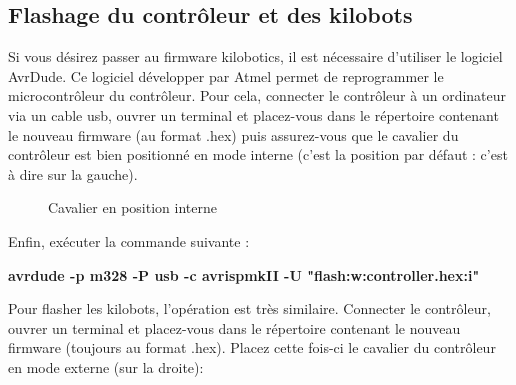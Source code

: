 \documentclass[a4paper,8pt]{report}
\begin{document}
\subsection*{Flashage du contr\^oleur et des kilobots}\label{sec:name}

Si vous d\'esirez passer au firmware kilobotics, il est n\'ecessaire d'utiliser le logiciel AvrDude. Ce logiciel d\'evelopper par Atmel permet de reprogrammer le microcontr\^oleur du contr\^oleur. Pour cela, connecter le contr\^oleur \`a un ordinateur via un cable usb, ouvrer un terminal et placez-vous dans le r\'epertoire contenant le nouveau firmware (au format .hex) puis assurez-vous que le cavalier du contr\^oleur est bien positionn\'e en mode interne (c'est la position par d\'efaut : c'est \`a dire sur la gauche). \\

\begin{figure}[!h]
    \centering
    \caption{Cavalier en position interne}
\end{figure}

Enfin, ex\'ecuter la commande suivante :\\

\begin{center}
  \textbf{avrdude -p m328  -P usb -c avrispmkII -U "flash:w:controller.hex:i"}
\end{center}

Pour flasher les kilobots, l'op\'eration est tr\`es similaire. Connecter le contr\^oleur, ouvrer un terminal et placez-vous dans le r\'epertoire contenant le nouveau firmware (toujours au format .hex). Placez cette fois-ci le cavalier du contr\^oleur en mode externe (sur la droite): \\
\end{document}
